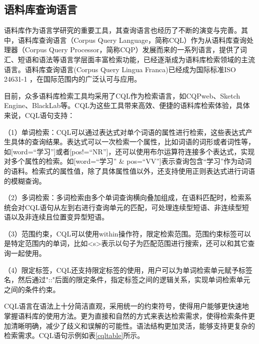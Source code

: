 \documentclass[11pt]{article}
\begin{document}
\begin{CJK*}{UTF8}{gbsn}
\subsection{语料库查询语言}

语料库作为语言学研究的重要工具，其查询语言也经历了不断的演变与完善。其中，语料库查询语言（Corpus Query Language，简称CQL）作为从语料库查询处理器（Corpus Query Processor，简称CQP）发展而来的一系列语言，提供了词汇、短语和语法等语言学层面丰富检索功能\cite{wuliangping}，已经逐渐成为语料库检索领域的主流语言。语料库查询语言(Corpus Query Lingua Franca)已经成为国际标准ISO 24631-1 \cite{banski-etal-2016-corpus}，在国际范围内的广泛认可与应用。

目前，众多语料库检索工具均采用了CQL作为检索语言，如CQPweb\cite{hardie2012cqpweb}、Sketch Engine\cite{sketchengine1}、BlackLab\cite{blacklab}等。CQL为这些工具带来高效、便捷的语料库检索体验，具体来说，CQL语句支持：

（1）单词检索：CQL可以通过表达式对单个词语的属性进行检索，这些表达式产生具体的查询结果。表达式可以一次检索一个属性，比如词语的词形或者词性等，如[word=“学习”]或者[pos!=“NR”]，还可以使用布尔运算符连接多个表达式，实现对多个属性的检索。如[word=“学习” \& pos=“VV”]表示查询包含“学习”作为动词的语料。检索式的属性值，除了具体属性值以外，还支持使用正则表达式进行词语的模糊查询。

（2）多词检索：多词检索由多个单词查询横向叠加组成，在语料匹配时，检索系统会对CQL语句从左到右进行查询单元的匹配，可处理连续型短语、非连续型短语以及非连续且位置变异型短语\cite{wuliangping}。

（3）范围约束，CQL可以使用within操作符，限定检索范围。范围约束标签可以是特定范围内的单词，比如\textless s\textgreater 表示以句子为匹配范围进行搜索，还可以和其它查询一起使用。

（4）限定标签，CQL还支持限定标签的使用，用户可以为单词检索单元赋予标签名，然后通过"::"后面的限定条件，指定标签之间的逻辑关系，实现单词检索单元之间的条件约束。

CQL语言在语法上十分简洁直观，采用统一的约束符号，使得用户能够更快速地掌握语料库的使用方法。更为直接和自然的方式来表达检索需求，使得检索条件更加清晰明确，减少了歧义和误解的可能性。语法结构更加灵活，能够支持更复杂的检索需求。CQL语句示例如表\ref{cqltable}所示。


\end{CJK*}
\end{document}
